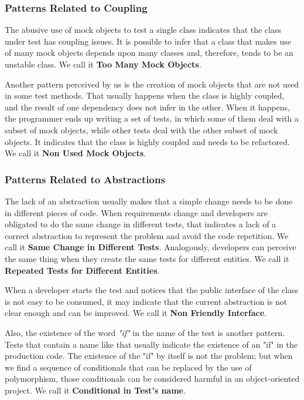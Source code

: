 \documentclass[times]{elsarticle}
\begin{document}
\subsubsection{Patterns Related to Coupling}

The abusive use of mock objects to test a single class indicates that
the class under test has coupling issues. It is possible to infer that a class
that makes use of many mock objects depends upon many classes and, therefore,
tends to be an unstable class. We call it \textbf{Too Many Mock Objects}.

Another pattern perceived by us is the creation of mock objects that are
not used in some test methods. That usually happens when the class
is highly coupled, and the result of one dependency does not infer in
the other. When it happens, the programmer ends up writing a set of tests,
in which some of them deal with a subset of mock objects, while other
tests deal with the other subset of mock objects. It indicates that
the class is highly coupled and needs to be refactored. We call it
\textbf{Non Used Mock Objects}.

\subsubsection{Patterns Related to Abstractions}

The lack of an abstraction usually makes that a simple change needs to
be done in different pieces of code. When requirements change and
developers are obligated to do the same change in different tests,
that indicates a lack of a correct abstraction to represent the problem
and avoid the code repetition. We call it \textbf{Same Change in Different Tests}.
Analogously, developers can perceive the same thing when they create the
same tests for different entities. We call it \textbf{Repeated Tests for Different Entities}.

When a developer starts the test and notices that the public interface of the class
is not easy to be consumed, it may indicate that the current abstraction is not
clear enough and can be improved. We call it \textbf{Non Friendly Interface}.

Also, the existence of the word \textit{"if"} in the name of the test is another
pattern. Tests that contain a name like that usually indicate the existence
of an "if" in the production code. The existence of the "if" by itself is not the problem;
but when we find a sequence of conditionals that can be replaced by the use of polymorphism,
those conditionals can be considered harmful in an object-oriented project. 
We call it \textbf{Conditional in Test's name}.
\end{document}

